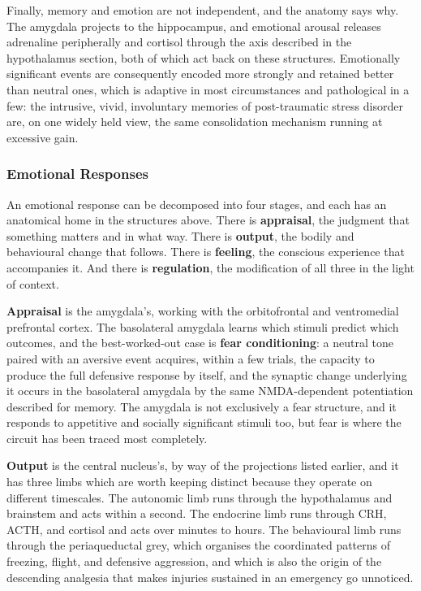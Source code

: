 \documentclass[11pt]{article}
\begin{document}
Finally, memory and emotion are not independent, and the anatomy says why. The amygdala projects to the hippocampus, and emotional arousal releases adrenaline peripherally and cortisol through the axis described in the hypothalamus section, both of which act back on these structures. Emotionally significant events are consequently encoded more strongly and retained better than neutral ones, which is adaptive in most circumstances and pathological in a few: the intrusive, vivid, involuntary memories of post-traumatic stress disorder are, on one widely held view, the same consolidation mechanism running at excessive gain.

\subsubsection{Emotional Responses}

An emotional response can be decomposed into four stages, and each has an anatomical home in the structures above. There is \textbf{appraisal}, the judgment that something matters and in what way. There is \textbf{output}, the bodily and behavioural change that follows. There is \textbf{feeling}, the conscious experience that accompanies it. And there is \textbf{regulation}, the modification of all three in the light of context.

\textbf{Appraisal} is the amygdala's, working with the orbitofrontal and ventromedial prefrontal cortex. The basolateral amygdala learns which stimuli predict which outcomes, and the best-worked-out case is \textbf{fear conditioning}: a neutral tone paired with an aversive event acquires, within a few trials, the capacity to produce the full defensive response by itself, and the synaptic change underlying it occurs in the basolateral amygdala by the same NMDA-dependent potentiation described for memory. The amygdala is not exclusively a fear structure, and it responds to appetitive and socially significant stimuli too, but fear is where the circuit has been traced most completely.

\textbf{Output} is the central nucleus's, by way of the projections listed earlier, and it has three limbs which are worth keeping distinct because they operate on different timescales. The autonomic limb runs through the hypothalamus and brainstem and acts within a second. The endocrine limb runs through CRH, ACTH, and cortisol and acts over minutes to hours. The behavioural limb runs through the periaqueductal grey, which organises the coordinated patterns of freezing, flight, and defensive aggression, and which is also the origin of the descending analgesia that makes injuries sustained in an emergency go unnoticed.
\end{document}
